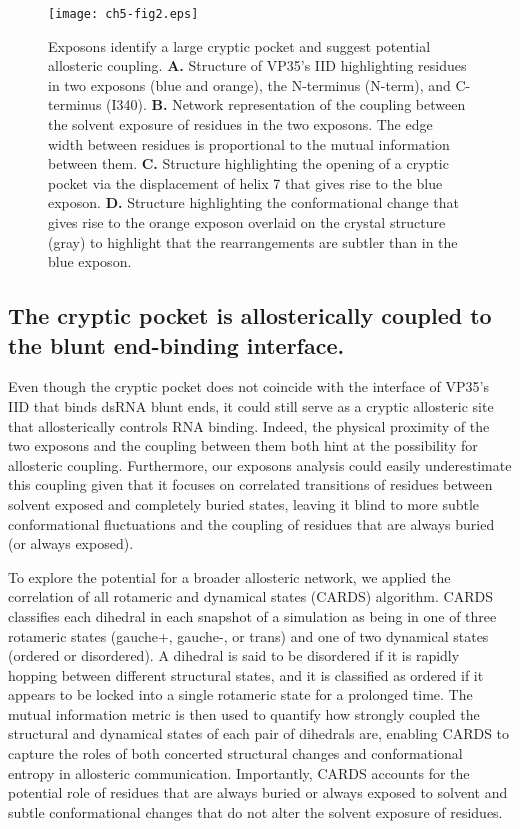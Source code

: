 \documentclass[../main.tex]{subfiles}
\begin{document}
    \begin{figure}[!htb] %
        \centering
        \texttt{[image: ch5-fig2.eps]}
        \caption[Exposons identify a large cryptic pocket and suggest potential allosteric coupling]
            {Exposons identify a large cryptic pocket and suggest potential allosteric coupling. \textbf{A.} Structure of VP35’s IID highlighting residues in two exposons (blue and orange), the N-terminus (N-term), and C-terminus (I340). \textbf{B.} Network representation of the coupling between the solvent exposure of residues in the two exposons. The edge width between residues is proportional to the mutual information between them. \textbf{C.} Structure highlighting the opening of a cryptic pocket via the displacement of helix 7 that gives rise to the blue exposon. \textbf{D.} Structure highlighting the conformational change that gives rise to the orange exposon overlaid on the crystal structure (gray) to highlight that the rearrangements are subtler than in the blue exposon.}
        \label{fig:ch5-fig2}
    \end{figure}

    \subsection{The cryptic pocket is allosterically coupled to the blunt end-binding interface.}
        Even though the cryptic pocket does not coincide with the interface of VP35’s IID that binds dsRNA blunt ends, it could still serve as a cryptic allosteric site that allosterically controls RNA binding. Indeed, the physical proximity of the two exposons and the coupling between them both hint at the possibility for allosteric coupling. Furthermore, our exposons analysis could easily underestimate this coupling given that it focuses on correlated transitions of residues between solvent exposed and completely buried states, leaving it blind to more subtle conformational fluctuations and the coupling of residues that are always buried (or always exposed). 

        To explore the potential for a broader allosteric network, we applied the correlation of all rotameric and dynamical states (CARDS) algorithm\cite{Singh:2017hh}. CARDS classifies each dihedral in each snapshot of a simulation as being in one of three rotameric states (gauche+, gauche-, or trans) and one of two dynamical states (ordered or disordered). A dihedral is said to be disordered if it is rapidly hopping between different structural states, and it is classified as ordered if it appears to be locked into a single rotameric state for a prolonged time. The mutual information metric is then used to quantify how strongly coupled the structural and dynamical states of each pair of dihedrals are, enabling CARDS to capture the roles of both concerted structural changes and conformational entropy in allosteric communication. Importantly, CARDS accounts for the potential role of residues that are always buried or always exposed to solvent and subtle conformational changes that do not alter the solvent exposure of residues.
\end{document}
